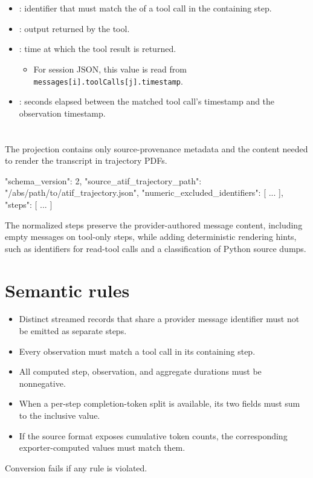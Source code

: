 \documentclass[11pt]{article}
\begin{document}
\section*{\texorpdfstring{}{Observation Schema}}
\begin{itemize}[leftmargin=2em]
  \item {}: identifier that must match the  of a tool call in the containing  step.
  \item {}: output returned by the tool.
  \item {}: time at which the tool result is returned.
    \begin{itemize}
      \item For  session JSON, this value is read from \nolinkurl{messages[i].toolCalls[j].timestamp}.
    \end{itemize}
  \item {}: seconds elapsed between the matched tool call's timestamp and the observation timestamp.
\end{itemize}

\section*{\texorpdfstring{}{atif_trajectory.pdf.json}}
\label{sec:atif-pdf-projection}

The projection contains only source-provenance metadata and the content needed to render the transcript in trajectory PDFs.
\begin{DocCode}
{
  "schema_version": 2,
  "source_atif_trajectory_path": "/abs/path/to/atif_trajectory.json",
  "numeric_excluded_identifiers": [ ... ],
  "steps": [ ... ]
}
\end{DocCode}

The normalized steps preserve the provider-authored message content, including empty messages on tool-only steps, while adding deterministic rendering hints, such as identifiers for read-tool calls and a classification of Python source dumps.
\section*{Semantic rules}
\begin{itemize}
  \item Distinct streamed records that share a provider message identifier must not be emitted as separate  steps.
  \item Every observation must match a tool call in its containing  step.
  \item All computed step, observation, and aggregate durations must be nonnegative.
  \item When a per-step completion-token split is available, its two fields must sum to the inclusive  value.
  \item If the source format exposes cumulative token counts, the corresponding exporter-computed values must match them.
\end{itemize}
Conversion fails if any rule is violated.
\end{document}
